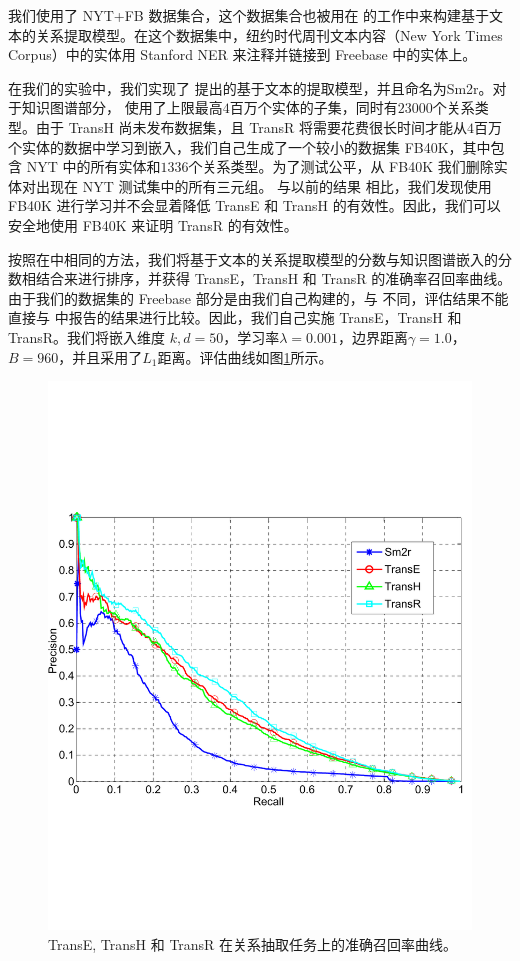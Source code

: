     我们使用了 NYT+FB 数据集合，这个数据集合也被用在 \cite{weston2013connecting} 的工作中来构建基于文本的关系提取模型。在这个数据集中，纽约时代周刊文本内容（New York Times Corpus）中的实体用 Stanford NER 来注释并链接到 Freebase 中的实体上。

    在我们的实验中，我们实现了 \cite{weston2013connecting} 提出的基于文本的提取模型，并且命名为Sm2r。对于知识图谱部分，\cite{weston2013connecting} 使用了上限最高$4$百万个实体的子集，同时有$23000$个关系类型。由于 TransH 尚未发布数据集，且 TransR 将需要花费很长时间才能从$4$百万个实体的数据中学习到嵌入，我们自己生成了一个较小的数据集 FB40K，其中包含 NYT 中的所有实体和$1336$个关系类型。为了测试公平，从 FB40K 我们删除实体对出现在 NYT 测试集中的所有三元组。 与以前的结果 \cite{weston2013connecting,wang2014knowledge} 相比，我们发现使用 FB40K 进行学习并不会显着降低 TransE 和 TransH 的有效性。因此，我们可以安全地使用 FB40K 来证明 TransR 的有效性。

    按照在\cite{weston2013connecting}中相同的方法，我们将基于文本的关系提取模型的分数与知识图谱嵌入的分数相结合来进行排序，并获得 TransE，TransH 和 TransR 的准确率召回率曲线。由于我们的数据集的 Freebase 部分是由我们自己构建的，与 \cite{wang2014knowledge} 不同，评估结果不能直接与 \cite{wang2014knowledge} 中报告的结果进行比较。因此，我们自己实施 TransE，TransH 和 TransR。我们将嵌入维度 $k, d = 50$，学习率$\lambda = 0.001$，边界距离$\gamma = 1.0$，$B = 960$，并且采用了$L_1$距离。评估曲线如图\ref{fig_1:relation_extraction}所示。

    \begin{figure}[htb]
    \centering
    \includegraphics[width=0.8\columnwidth]{figures/trans/RE_text}
    \caption{TransE, TransH 和 TransR 在关系抽取任务上的准确召回率曲线。}
    \label{fig_1:relation_extraction}
    \end{figure}

